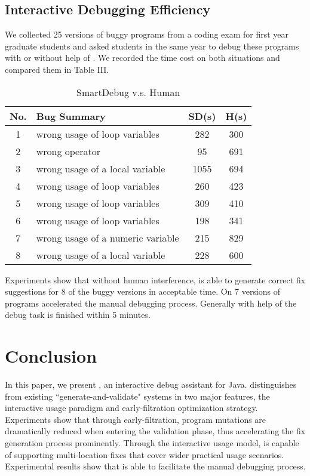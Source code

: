 \subsection{Interactive Debugging Efficiency}
We collected 25 versions of buggy programs from a coding exam for first year graduate students and asked students in the same year to debug these programs with or without help of \SmartDebug. We recorded the time cost on both situations and compared them in Table III.


\begin{table}[!b]
	\label{tab:sd-vs-human}
	\centering
	\caption{SmartDebug v.s. Human}
	\vspace{-0.8em}
	\begin{tabular}{|c|l|c|c|} \hline
		No.& Bug Summary 									& SD(s) & H(s)	\\	\hline
		1  & wrong usage of loop variables					& 282	& 300	\\	\hline
		2  & wrong operator									& 95	& 691	\\	\hline
		3  & wrong usage of a local variable				& 1055	& 694	\\  \hline
		4  & wrong usage of loop variables					& 260	& 423	\\	\hline
		5  & wrong usage of loop variables					& 309	& 410	\\	\hline
		6  & wrong usage of loop variables					& 198	& 341 	\\	\hline
		7 & wrong usage of a numeric variable				& 215	& 829	\\	\hline
		8 & wrong usage of a local variable				& 228	& 600	\\	\hline
		
	\end{tabular}
\end{table}

Experiments show that without human interference, \SmartDebug is able to generate correct fix suggestions for 8 of the buggy versions in acceptable time. On 7 versions of programs \SmartDebug accelerated the manual debugging process. Generally with help of \SmartDebug the debug task is finished within 5 minutes.

\section{Conclusion}
In this paper, we present \SmartDebug, an interactive debug assistant for Java. \SmartDebug distinguishes from existing ``generate-and-validate" systems in two major features, the interactive usage paradigm and early-filtration optimization strategy. Experiments show that through early-filtration, program mutations are dramatically reduced when entering the validation phase, thus accelerating the fix generation process prominently. Through the interactive usage model, \SmartDebug is capable of supporting multi-location fixes that cover wider practical usage scenarios. Experimental results show that \SmartDebug is able to facilitate the manual debugging process.